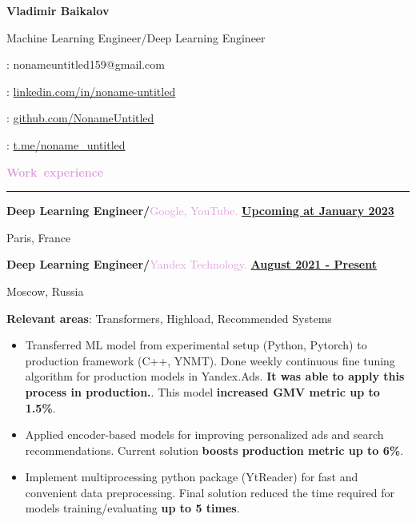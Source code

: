 \documentclass[11pt,a4paper]{report}
\author{Vladimir Baikalov}
\begin{document}
\noindent
\begin{minipage}[c]{0.66\linewidth}
\Huge{\textbf{Vladimir Baikalov}}

\small{Machine Learning Engineer/Deep Learning Engineer}
\end{minipage} %
\begin{minipage}[c]{0.33\linewidth}
\Letter: nonameuntitled159@gmail.com

\faLinkedin : \href{https://www.linkedin.com/in/noname-untitled}{linkedin.com/in/noname-untitled}

\faGithub:  \href{http://www.github.com/NonameUntitled}{github.com/NonameUntitled}

\faSend:  \href{http://www.t.me/noname\_untitled}{t.me/noname\_untitled}

\end{minipage}

\par\hbox{\Large{\textcolor{Plum}{\textbf{Work experience}}}}\kern3pt\hrule\kern5pt


\textbf{\large{Deep Learning Engineer/}}\textcolor{Plum}{Google, YouTube.}
\hfill
\textbf {\underline{Upcoming at January 2023}}

Paris, France

\vspace{2mm}

\textbf{\large{Deep Learning Engineer/}}\textcolor{Plum}{Yandex Technology.}
\hfill
\textbf {\underline{August 2021 - Present}}

Moscow, Russia

\textbf{Relevant areas}: Transformers, Highload, Recommended Systems
\begin{itemize}[label={}, left=10pt]

    \item  Transferred ML model from experimental setup (Python, Pytorch) to production framework (C++, YNMT). Done weekly continuous fine tuning algorithm for production models in Yandex.Ads. \textbf{It was able to apply this process in production.}. This model \textbf{increased GMV metric up to 1.5\%}.
    
    \item Applied encoder-based models for improving personalized ads and search recommendations. Current solution \textbf{boosts production metric up to 6\%}.
    
    \item Implement multiprocessing python package (YtReader) for fast and convenient data preprocessing. Final solution reduced the time required for models training/evaluating \textbf{up to 5 times}. 
\end{itemize}
\end{document}
